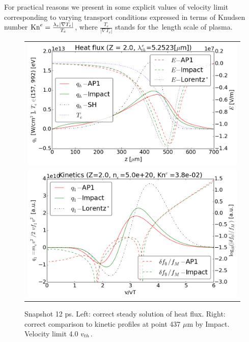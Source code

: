 For practical reasons we present in  
some explicit values of velocity limit corresponding to varying transport 
conditions expressed in terms of Knudsen number 
$\text{Kn}^e = \frac{\lambda_e |\nabla T_e|}{T_e}$, 
where $\frac{T_e}{|\nabla T_e|}$ stands for the~length scale of plasma.

\begin{figure}[tbh]
  \begin{center}
    \begin{tabular}{c}
      \includegraphics[width=\figscale\textwidth]{../VFPdata/C7_Impact_case3_heatflux.png} \\
      \includegraphics[width=\figscale\textwidth]{../VFPdata/C7_Impact_case3_kinetics.png}
    \end{tabular}
  \caption{  
  Snapshot 12 ps. Left: correct steady solution of heat flux. 
  Right: correct comparison to kinetic profiles at point 437 $\mu$m by Impact.
  Velocity limit 4.0 $v_{th}$.
  }
  \label{fig:C7_Impact_case3}
  \end{center} 
\end{figure}

